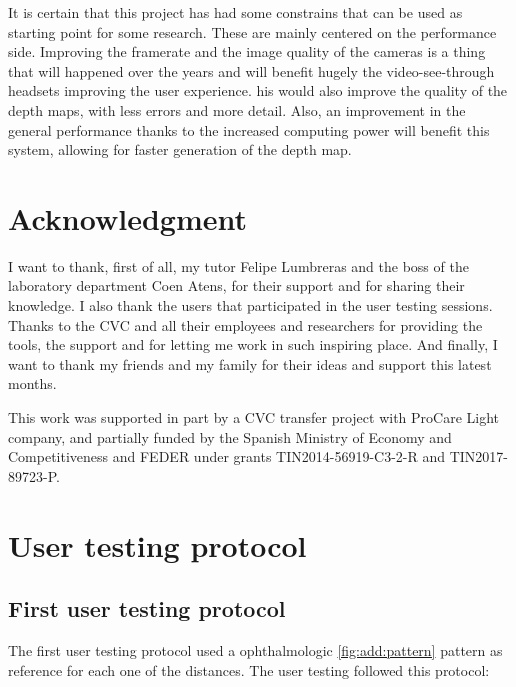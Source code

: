 \documentclass[10pt,a4paper,twocolumn,twoside]{article}
\begin{document}
	It is certain that this project has had some constrains that can be used as starting point for some research. These are mainly centered on the performance side. Improving the framerate and the image quality of the cameras is a thing that will happened over the years and will benefit hugely the video-see-through headsets improving the user experience.
	his would also improve the quality of the depth maps, with less errors and more detail. Also, an improvement in the general performance thanks to the increased computing power will benefit this system, allowing for faster generation of the depth map.  
	
	\section*{Acknowledgment}
	I want to thank, first of all, my tutor Felipe Lumbreras and the boss of the laboratory department Coen Atens, for their support and for sharing their knowledge. I also thank the users that participated in the user testing sessions. Thanks to the CVC and all their employees and researchers for providing the tools, the support and for letting me work in such inspiring place. And finally, I want to thank my friends and my family for their ideas and support this latest months. 
	
	This work was supported in part by a CVC transfer project with ProCare Light company, and partially funded by the Spanish Ministry of Economy and Competitiveness and FEDER under grants TIN2014-56919-C3-2-R and TIN2017-89723-P.
	
	
	
	
	\appendix
	
	
	\section{User testing protocol}
	\subsection{First user testing protocol}
	\label{sec:annex:user1}
	The first user testing protocol used a ophthalmologic \ref{fig:add:pattern} pattern as reference for each one of the distances. The user testing followed this protocol: 
	
\end{document}
